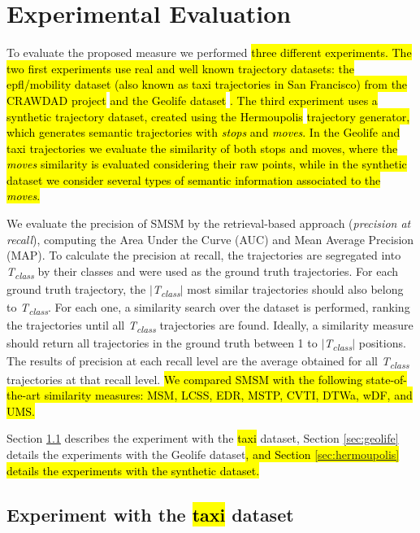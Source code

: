 \documentclass[12pt]{article}
\begin{document}
\section{Experimental Evaluation} \label{sec:experiments}
To evaluate the proposed measure we performed \hl{three different experiments. The two first experiments use real and well known trajectory datasets: the epfl/mobility dataset (also known as taxi trajectories in San Francisco) from the CRAWDAD project }\citep{epfl-mobility-20090224}\hl{ and the Geolife dataset }\citep{zheng2009mining}\hl{. The third experiment uses a synthetic trajectory dataset, created using the Hermoupolis }\citep{Pelekis-Hermoupolis}\hl{ trajectory generator, which generates semantic trajectories with \emph{stops} and \emph{moves}. In the Geolife and taxi trajectories we evaluate the similarity of both stops and moves, where the \emph{moves} similarity is evaluated considering their raw points, while in the synthetic dataset we consider several types of semantic information associated to the \emph{moves}.}

We evaluate the precision of SMSM by the retrieval-based approach (\textit{precision at recall}), computing the Area Under the Curve (AUC) and Mean Average Precision (MAP). To calculate the precision at recall, the trajectories are segregated into \textit{T\textsubscript{class}} by their classes and were used as the ground truth trajectories. For each ground truth trajectory, the $|$\textit{T\textsubscript{class}}$|$ most similar trajectories should also belong to \textit{T\textsubscript{class}}. For each one, a similarity search over the dataset is performed, ranking the trajectories until all \textit{T\textsubscript{class}} trajectories are found. Ideally, a similarity measure should return all trajectories in the ground truth between 1 to $|$\textit{T\textsubscript{class}}$|$ positions. The results of precision at each recall level are the average obtained for all \textit{T\textsubscript{class}} trajectories at that recall level. \hl{We compared SMSM with the following state-of-the-art similarity measures: MSM, LCSS, EDR, MSTP, CVTI, DTWa, wDF, and UMS.}

Section \ref{sec:new_crawdad} describes the experiment with the \hl{taxi} dataset, Section \ref{sec:geolife} details the experiments with the Geolife dataset\hl{, and Section {\ref{sec:hermoupolis}} details the experiments with the synthetic dataset.}

\subsection{Experiment with the \hl{taxi} dataset}\label{sec:new_crawdad}
\end{document}
